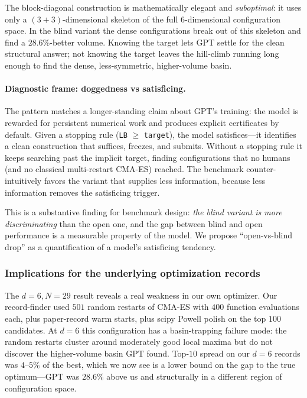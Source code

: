 \documentclass[11pt]{article}
\begin{document}
The block-diagonal construction is mathematically elegant and
\emph{suboptimal}: it uses only a $(3+3)$-dimensional skeleton of
the full $6$-dimensional configuration space.  In the blind variant
the dense configurations break out of this skeleton and find a
$28.6\%$-better volume.  Knowing the target lets GPT settle for
the clean structural answer; not knowing the target leaves the
hill-climb running long enough to find the dense, less-symmetric,
higher-volume basin.

\paragraph{Diagnostic frame: doggedness vs satisficing.}
The pattern matches a longer-standing claim about GPT's training:
the model is rewarded for persistent numerical work and produces
explicit certificates by default.  Given a stopping rule
(\texttt{LB} $\geq$ \texttt{target}), the model satisfices---it
identifies a clean construction that suffices, freezes, and
submits.  Without a stopping rule it keeps searching past the
implicit target, finding configurations that no humans (and no
classical multi-restart CMA-ES) reached.  The benchmark
counter-intuitively favors the variant that supplies less
information, because less information removes the satisficing
trigger.

This is a substantive finding for benchmark design: \emph{the
blind variant is more discriminating} than the open one, and the
gap between blind and open performance is a measurable property
of the model.  We propose ``open-vs-blind drop'' as a
quantification of a model's satisficing tendency.

\subsubsection{Implications for the underlying optimization records}

The $d = 6, N = 29$ result reveals a real weakness in our own
optimizer.  Our record-finder used $501$ random restarts of
CMA-ES with $400$ function evaluations each, plus paper-record
warm starts, plus scipy Powell polish on the top $100$
candidates.  At $d = 6$ this configuration has a basin-trapping
failure mode: the random restarts cluster around moderately good
local maxima but do not discover the higher-volume basin GPT
found.  Top-$10$ spread on our $d = 6$ records was $4$--$5\%$ of
the best, which we now see is a lower bound on the gap to the
true optimum---GPT was $28.6\%$ above us and structurally in a
different region of configuration space.
\end{document}
